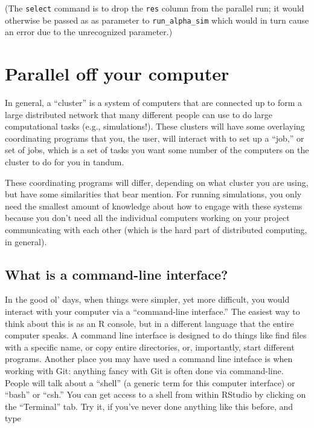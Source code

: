 \documentclass[
]{book}
\begin{document}
(The \texttt{select} command is to drop the \texttt{res} column from the parallel run; it would otherwise be passed as as parameter to \texttt{run\_alpha\_sim} which would in turn cause an error due to the unrecognized parameter.)

\section{Parallel off your computer}\label{parallel-off-your-computer}

In general, a ``cluster'' is a system of computers that are connected up to form a large distributed network that many different people can use to do large computational tasks (e.g., simulations!).
These clusters will have some overlaying coordinating programs that you, the user, will interact with to set up a ``job,'' or set of jobs, which is a set of tasks you want some number of the computers on the cluster to do for you in tandum.

These coordinating programs will differ, depending on what cluster you are using, but have some similarities that bear mention.
For running simulations, you only need the smallest amount of knowledge about how to engage with these systems because you don't need all the individual computers working on your project communicating with each other (which is the hard part of distributed computing, in general).

\subsection{What is a command-line interface?}\label{what-is-a-command-line-interface}

In the good ol' days, when things were simpler, yet more difficult, you would interact with your computer via a ``command-line interface.''
The easiest way to think about this is as an R console, but in a different language that the entire computer speaks.
A command line interface is designed to do things like find files with a specific name, or copy entire directories, or, importantly, start different programs.
Another place you may have used a command line inteface is when working with Git: anything fancy with Git is often done via command-line.
People will talk about a ``shell'' (a generic term for this computer interface) or ``bash'' or ``csh.''
You can get access to a shell from within RStudio by clicking on the ``Terminal'' tab.
Try it, if you've never done anything like this before, and type
\end{document}
